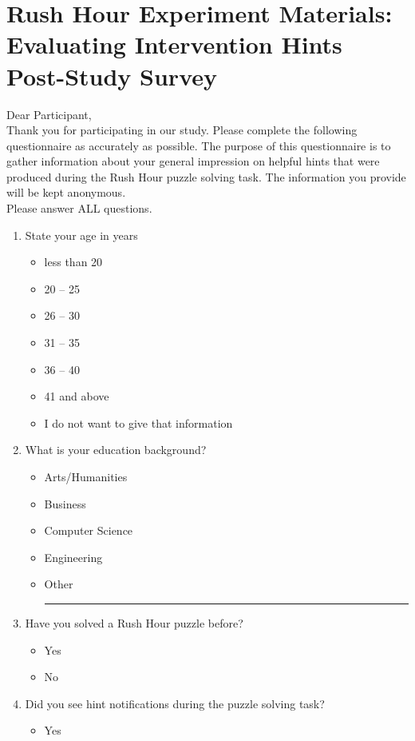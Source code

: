 \chapter{Rush Hour Experiment Materials: Evaluating Intervention Hints Post-Study Survey}
\label{apx:rushpost}
Dear Participant,\\
Thank you for participating in our study. Please complete the following questionnaire as accurately as possible. The purpose of this questionnaire is to gather information about your general impression on helpful hints that were produced during the Rush Hour puzzle solving task. The information you provide will be kept anonymous. \\
Please answer ALL questions.

\begin{enumerate}[topsep=-4em]
\item State your age in years
\begin{itemize}[topsep=-6em, label={o}]
\itemsep-1em 
\item less than 20
\item 20 -- 25
\item 26 -- 30
\item 31 -- 35
\item 36 -- 40
\item 41 and above
\item I do not want to give that information
\end{itemize}
\item What is your education background?
\begin{itemize}[topsep=-6em, label={o}]
\itemsep-1em 
\item Arts/Humanities
\item Business
\item Computer Science
\item Engineering
\item Other \rule{4cm}{0.4pt}
\end{itemize}
\item Have you solved a Rush Hour puzzle before?
\begin{itemize}[topsep=-6em, label={o}]
\itemsep-1em 
\item Yes
\item No
\end{itemize}
\item Did you see hint notifications during the puzzle solving task?
\begin{itemize}[topsep=-6em, label={o}]
\itemsep-1em 
\item Yes

\end{itemize}
\end{enumerate}
